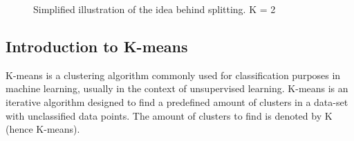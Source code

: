 \begin{figure}
	\centering
		\qquad
		\newline
		\qquad
		\caption{Simplified illustration of the idea behind splitting. K = 2}%
		\label{fig:splitting}%
\end{figure}



\subsection{Introduction to K-means}
K-means is a clustering algorithm commonly used for classification purposes in machine learning, usually in the context of unsupervised learning. K-means
is an iterative algorithm designed to find a predefined amount of clusters in a data-set with unclassified data points. The amount of clusters to find is denoted by
K (hence K-means). 

